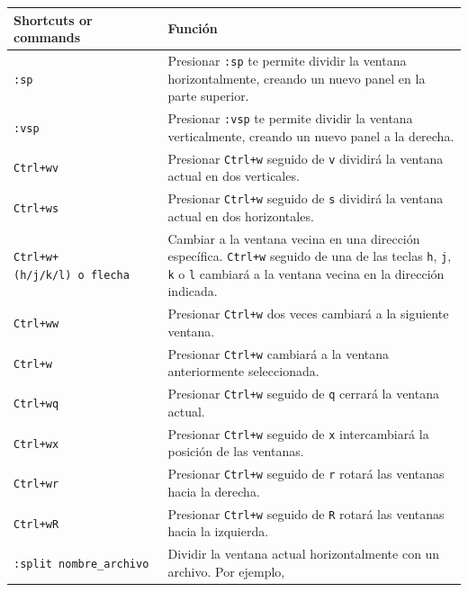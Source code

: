 \documentclass[
  doc,
  floatsintext,
  longtable,
  a4paper,
  nolmodern,
  notxfonts,
  notimes,
  12pt,
  colorlinks=true,linkcolor=blue,citecolor=blue,urlcolor=blue]{apa7}
\newcounter{none} %
\begin{document}
{\def\LTcaptype{none} %
\begin{longtable}[]{@{}
  >{\raggedright\arraybackslash}p{}
  >{\raggedright\arraybackslash}p{}@{}}
\toprule\noalign{}
\begin{minipage}[b]{\linewidth}\raggedright
Shortcuts or commands
\end{minipage} & \begin{minipage}[b]{\linewidth}\raggedright
Función
\end{minipage} \\
\midrule\noalign{}
\endhead
\bottomrule\noalign{}
\endlastfoot
\texttt{:sp} & Presionar \texttt{:sp} te permite dividir la ventana
horizontalmente, creando un nuevo panel en la parte superior. \\
\texttt{:vsp} & Presionar \texttt{:vsp} te permite dividir la ventana
verticalmente, creando un nuevo panel a la derecha. \\
\texttt{Ctrl+wv} & Presionar \texttt{Ctrl+w} seguido de \texttt{v}
dividirá la ventana actual en dos verticales. \\
\texttt{Ctrl+ws} & Presionar \texttt{Ctrl+w} seguido de \texttt{s}
dividirá la ventana actual en dos horizontales. \\
\texttt{Ctrl+w+(h/j/k/l)\ o\ flecha} & Cambiar a la ventana vecina en
una dirección específica. \texttt{Ctrl+w} seguido de una de las teclas
\texttt{h}, \texttt{j}, \texttt{k} o \texttt{l} cambiará a la ventana
vecina en la dirección indicada. \\
\texttt{Ctrl+ww} & Presionar \texttt{Ctrl+w} dos veces cambiará a la
siguiente ventana. \\
\texttt{Ctrl+w} & Presionar \texttt{Ctrl+w} cambiará a la ventana
anteriormente seleccionada. \\
\texttt{Ctrl+wq} & Presionar \texttt{Ctrl+w} seguido de \texttt{q}
cerrará la ventana actual. \\
\texttt{Ctrl+wx} & Presionar \texttt{Ctrl+w} seguido de \texttt{x}
intercambiará la posición de las ventanas. \\
\texttt{Ctrl+wr} & Presionar \texttt{Ctrl+w} seguido de \texttt{r}
rotará las ventanas hacia la derecha. \\
\texttt{Ctrl+wR} & Presionar \texttt{Ctrl+w} seguido de \texttt{R}
rotará las ventanas hacia la izquierda. \\
\texttt{:split\ nombre\_archivo} & Dividir la ventana actual
horizontalmente con un archivo. Por ejemplo,

\end{longtable}}
\end{document}
